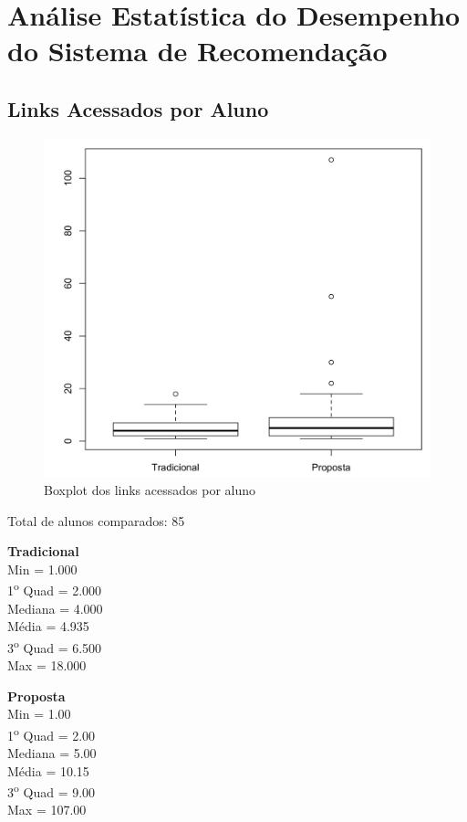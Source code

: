 \chapter{Análise Estatística do Desempenho do Sistema de Recomendação}\label{ape:analise-estatistica-do-uso}

\section{Links Acessados por Aluno}

\begin{figure}[htb]
  \caption{\label{fig:uso-sr-boxplot}Boxplot dos links acessados por aluno}
  \begin{center}
      \includegraphics[scale=0.4]{./Figuras/uso-sr-boxplot.png}
  \end{center}
\end{figure}

\noindent
Total de alunos comparados: 85

\begin{multicols}{2}

\noindent\textbf{Tradicional}\\
Min =  1.000\\
1\textsuperscript{o} Quad =  2.000\\
Mediana =  4.000\\
Média =  4.935\\
3\textsuperscript{o} Quad = 6.500\\
Max = 18.000\\

\columnbreak

\noindent\textbf{Proposta}\\
 Min =   1.00\\
 1\textsuperscript{o} Quad =   2.00\\
 Mediana =   5.00\\
 Média =  10.15\\
 3\textsuperscript{o} Quad =  9.00\\
 Max = 107.00
\end{multicols}

